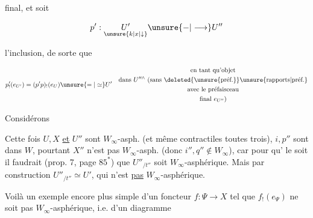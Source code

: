 
final, et soit

\[
 p':\underset{\unsure{k|x|\downarrow}}{U'}\unsure{\mathbin{-}|\longrightarrow} U''
\]

l'inclusion, de sorte que

\[
 p'_!(e_{U'})=(p'p)_!(e_U)\unsure{=|\simeq} U'
 \quad\begin{gathered}\text{en tant qu'objet}\\
 \text{dans }U''^\wedge\ \text{(sans \deleted{\unsure{préf.}}\unsure{rapports|préf.}}\\
 \text{avec le préfaisceau}\\
 \text{final }e_{U''}\text{)}\end{gathered}
\]

Considérons


Cette fois $U,X$ \uline{et} $U''$ sont $W_\infty$-asph. (et même contractiles toutes trois),   $i,p''$ sont dans $W$, pourtant $X''$ n'est pas $W_\infty$-asph. (donc $i'',q''\notin W_\infty$), car pour qu' le soit  il faudrait (prop. 7,  page $85^*$) que  $U''_{/t''}$ soit $W_\infty$-asphérique. Mais par construction $U''_{/t''}\simeq U'$, qui n'est \uline{pas} $W_\infty$-asphérique.



Voilà un exemple encore plus simple d'un foncteur $f:\Psi\longrightarrow X$ tel que $f_!(e_\Psi)$ ne soit pas $W_\infty$-asphérique,  i.e. d'un diagramme


